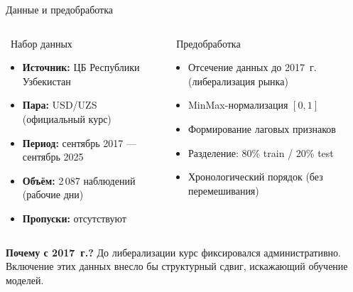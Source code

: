 \begin{frame}[shrink=10]{Данные и предобработка}

  \begin{columns}[T]
    \begin{block}{\faDatabase~Набор данных}
      \small
      \begin{itemize}
        \setlength\itemsep{2pt}
        \item \textbf{Источник:} ЦБ Республики Узбекистан
        \item \textbf{Пара:} USD/UZS (официальный курс)
        \item \textbf{Период:} сентябрь 2017 --- сентябрь 2025
        \item \textbf{Объём:} 2\,087 наблюдений (рабочие дни)
        \item \textbf{Пропуски:} отсутствуют
      \end{itemize}
    \end{block}

    \begin{block}{\faCogs~Предобработка}
      \small
      \begin{itemize}
        \setlength\itemsep{2pt}
        \item Отсечение данных до 2017~г. (либерализация рынка)
        \item MinMax-нормализация $[0, 1]$
        \item Формирование лаговых признаков
        \item Разделение: 80\% train / 20\% test
        \item Хронологический порядок (без перемешивания)
      \end{itemize}
    \end{block}
  \end{columns}

  \vspace{0.3cm}
  \begin{tcolorbox}[infobox]
    \small \textbf{Почему с 2017~г.?} До либерализации курс фиксировался административно. Включение этих данных внесло бы структурный сдвиг, искажающий обучение моделей.
  \end{tcolorbox}
\end{frame}

